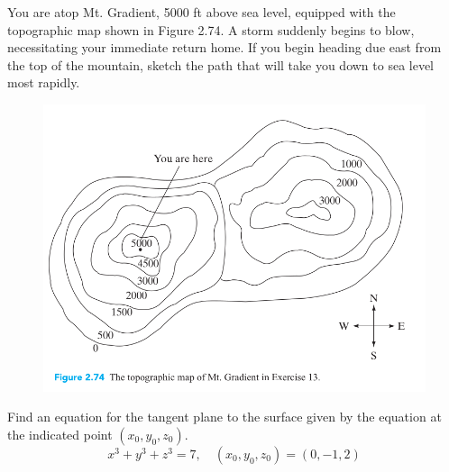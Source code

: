 \documentclass[12pt,letterpaper]{hmcpset}
\begin{document}
\begin{problem}[Colley 2.6.13]
  You are atop Mt. Gradient, 5000 ft above sea level, equipped with the topographic map shown in Figure 2.74.
  A storm suddenly begins to blow, necessitating your immediate return home.
  If you begin heading due east from the top of the mountain, sketch the path that will take you down to sea level most rapidly.
\end{problem}
  \begin{figure}[ht]
    \centering
    \includegraphics[width=\textwidth]{assets/10_map.png}
  \end{figure}
\clearpage

\begin{problem}[Colley 2.6.16]
  Find an equation for the tangent plane to the surface given by the equation at the indicated point $(x_0, y_0, z_0)$.
  \[ x^3 + y^3 + z^3 = 7,\quad (x_0, y_0, z_0) = (0, -1, 2) \]
\end{problem}
\end{document}
